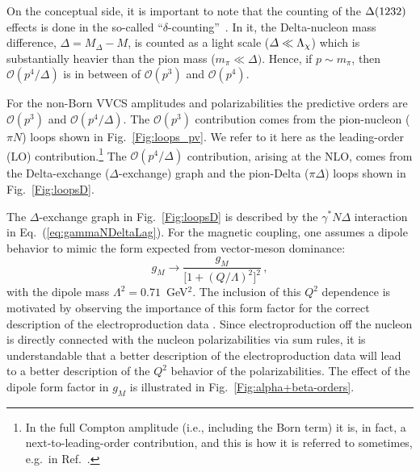 \documentclass[11pt,preprint,tightenlines,
showpacs,preprintnumbers,amsmath,amssymb,superscriptaddress,a4paper,nofootinbib]{revtex4-1}
\def\Eqref#1{Eq.~(\ref{eq:#1})}
\begin{document}
On the conceptual side, it is important to note that the counting of the $\Delta(1232)$ effects is done in the so-called ``$\delta$-counting''~\cite{Pascalutsa:2003aa}. In it, the Delta-nucleon mass difference,
$\varDelta=M_\Delta-M$, is counted as a light scale ($\varDelta \ll {\Lambda}_\chi$) which is
substantially heavier than the pion mass ($m_\pi\ll\varDelta)$. Hence, if $p\sim m_\pi$, 
then $\mathcal{O}(p^4/\varDelta)$ is in between of $\mathcal{O}(p^3)$ and $\mathcal{O}(p^4)$. 


For the non-Born VVCS amplitudes
and polarizabilities the predictive orders are $\mathcal{O}(p^3)$ and $\mathcal{O}(p^4/\varDelta)$.
The $\mathcal{O}(p^3)$ contribution comes from the pion-nucleon ($\pi N$) loops shown in Fig.~\ref{Fig:loops_pv}.
We refer to it here as the leading-order (LO) contribution.\footnote{In the full Compton amplitude (i.e., 
including the Born term) it is, in fact, a next-to-leading-order contribution, and this is how it is referred to sometimes, e.g.~in Ref.~\cite{Lensky:2009uv}. }
The $\mathcal{O}(p^4/\varDelta)$ contribution, arising at the NLO, 
comes from the Delta-exchange ($\Delta$-exchange) graph and the pion-Delta ($\pi \Delta$) loops shown in Fig.~\ref{Fig:loopsD}.

The $\Delta$-exchange graph in Fig.~\ref{Fig:loopsD} is described by the $\gamma^* N \Delta$ interaction in \Eqref{gammaNDeltaLag}. For the magnetic coupling, one assumes a dipole behavior to mimic the form expected from 
vector-meson dominance:
\begin{equation}
g_M\to \frac{g_M}{\big[1+\left(Q/\Lambda\right)^2\big]^2}\,,
\end{equation}
with the dipole mass $\Lambda^2=0.71$~GeV${^2}$. The inclusion of this $Q^2$ dependence is motivated by observing the importance of this form factor for the correct description of the electroproduction data \cite{Pascalutsa:2005vq}. Since electroproduction off the nucleon is directly connected with the nucleon polarizabilities via sum rules, it is understandable that a better description of the electroproduction data will lead to a better description of the $Q^2$ behavior of the polarizabilities. The effect of the dipole form factor in $g_M$ is illustrated in Fig.~\ref{Fig:alpha+beta-orders}.

\end{document}
